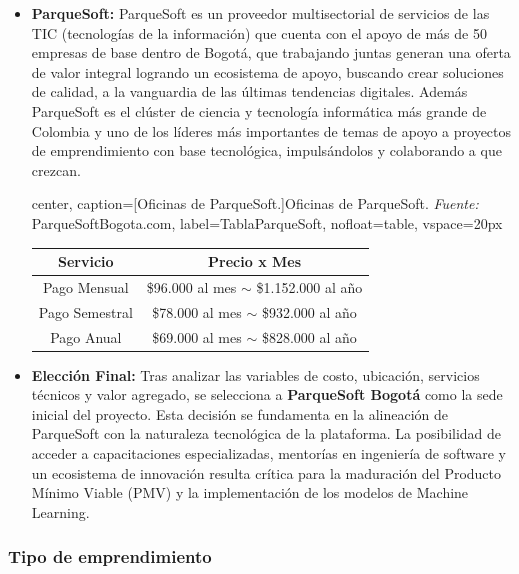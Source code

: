 \begin{itemize}
	\item \textbf{ParqueSoft:} ParqueSoft es un proveedor multisectorial de servicios de las TIC (tecnologías de la información) que cuenta con el apoyo de más de 50 empresas de base dentro de Bogotá, que trabajando juntas generan una oferta de valor integral logrando un ecosistema de apoyo, buscando crear soluciones de calidad, a la vanguardia de las últimas tendencias digitales. Además ParqueSoft es el clúster de ciencia y tecnología informática más grande de Colombia y uno de los líderes más importantes de temas de apoyo a proyectos de emprendimiento con base tecnológica, impulsándolos y colaborando a que crezcan.
	
	\begin{adjustbox}{
			center,
			caption=[{Oficinas de ParqueSoft.}]{\centering Oficinas de ParqueSoft. \textit{Fuente:} ParqueSoftBogota.com},
			label={TablaParqueSoft},
			nofloat=table, vspace={20px}}
			\begin{tabular}{|c|c|}
				\hline
				\rowcolor[HTML]{D9EAD3} 
				\textbf{Servicio} & \textbf{Precio x Mes} \\ \hline
				Pago Mensual & \$96.000 al mes $\sim$ \$1.152.000 al año \\ \hline
				Pago Semestral & \$78.000 al mes $\sim$ \$932.000 al año \\ \hline
				Pago Anual & \$69.000 al mes $\sim$ \$828.000 al año \\ \hline
			\end{tabular}
	\end{adjustbox}

	\item \textbf{Elección Final:} Tras analizar las variables de costo, ubicación, servicios técnicos y valor agregado, se selecciona a \textbf{ParqueSoft Bogotá} como la sede inicial del proyecto. Esta decisión se fundamenta en la alineación de ParqueSoft con la naturaleza tecnológica de la plataforma. La posibilidad de acceder a capacitaciones especializadas, mentorías en ingeniería de software y un ecosistema de innovación resulta crítica para la maduración del Producto Mínimo Viable (PMV) y la implementación de los modelos de Machine Learning.
	
\end{itemize}

\subsubsection*{Tipo de emprendimiento}

